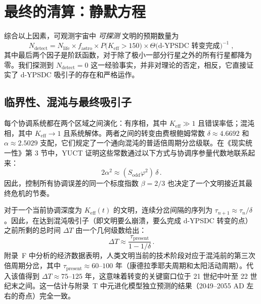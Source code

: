 \documentclass[11pt,a4paper]{article}
\newcommand{\Keff}{K_{\mathrm{eff}}}
\begin{document}
	\section{最终的清算：静默方程}
	\label{sec:final}
	综合以上因素，可观测宇宙中 \emph{可探测} 文明的预期数量为
	\begin{equation}
		\label{eq:N_detect}
		N_{\mathrm{detect}} = N_{\mathrm{life}}
		\times f_{\mathrm{astro}}
		\times P\bigl(\Keff > 150\bigr)
		\times \Theta\bigl(\text{d-YPSDC 转变完成}\bigr)^{-1}\; ,
	\end{equation}
	其中最后两个因子是阶跃函数，对于除了极小一部分行星之外的所有行星都降为零。我们探测到 \(N_{\mathrm{detect}} = 0\) 这一经验事实，并非对理论的否定，相反，它直接证实了 d-YPSDC 吸引子的存在和严格运作。
	
	\subsection{临界性、混沌与最终吸引子}
	\label{sec:chaos}
	
	每个协调系统都在两个区域之间演化：有序相，其中 \(K_{\mathrm{eff}} \gg 1\) 且错误率低；混沌相，其中 \(K_{\mathrm{eff}} \to 1\) 且系统解体。两者之间的转变由费根鲍姆常数 \(\delta \approx 4.6692\) 和 \(\alpha \approx 2.5029\) 支配，它们规定了一个通向混沌的普适倍周期分岔级联。在《现实统一性》第 3 节中，YUCT 证明这些常数通过以下方式与协调序参量代数地联系起来：
	\begin{equation}
		2\alpha^{2} \approx (S_{\mathrm{odd}}\varphi^{2})\,\delta \, .
	\end{equation}
	因此，控制所有协调误差的同一个标度指数 \(\beta = 2/3\) 也决定了一个文明接近其最终危机的节奏。
	
	对于一个当前协调深度为 \(K_{\mathrm{eff}}(t)\) 的文明，连续分岔间隔的序列为 \(\tau_{n+1} \approx \tau_{n} / \delta\)。因此，在达到混沌吸引子（即文明要么崩溃，要么完成 d-YPSDC 转变的点）之前所剩的总时间 \(\Delta T\) 由一个几何级数给出：
	\begin{equation}
		\Delta T \approx \frac{\tau_{\mathrm{present}}}{1 - 1/\delta} \, .
	\end{equation}
	附录~F 中分析的经济数据表明，人类文明当前的技术阶段对应于混沌前的第三次倍周期分岔，其中 \(\tau_{\mathrm{present}} \approx 60\)–\(100\) 年（康德拉季耶夫周期和太阳活动周期）。代入该值得到 \(\Delta T \approx 75\)–\(125\) 年，这意味着转变的关键窗口位于 21 世纪中叶至 22 世纪末之间。这一估计与附录~T 中元进化模型独立预测的结果（2049–2055 AD 左右的奇点）完全一致。
	
\end{document}
